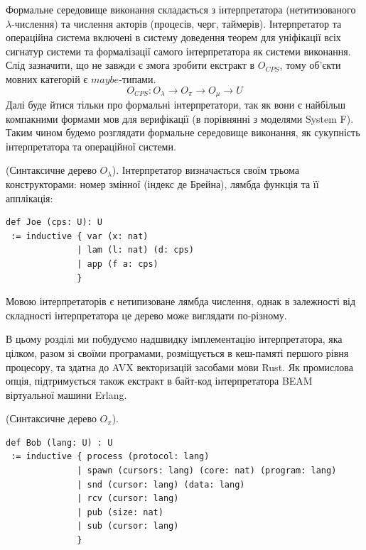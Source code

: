 Формальне середовище виконання складається з інтерпретатора
(нетитизованого $\lambda$-числення) та числення акторів (процесів, черг, таймерів).
Інтерпретатор та операційна система включені в систему доведення теорем
для уніфікації всіх сигнатур системи та формалізації самого інтерпретатора
як системи виконання. Слід зазначити, що не
завжди є змога зробити екстракт в $O_{CPS}$, тому об'єкти мовних
категорій є $maybe$-типами.
$$
O_{CPS}: O_\lambda \rightarrow O_\pi \rightarrow O_\mu \rightarrow U
$$
Далі буде йтися тільки про формальні інтерпретатори,
так як вони є найбільш компакними формами мов для
верифікації (в порівнянні з моделями System F).
Таким чином будемо розглядати формальне середовище виконання, як
сукупність інтерпретатора та операційної системи.

\begin{definition} (Синтаксичне дерево $O_\lambda$). Інтерпретатор визначається
своїм трьома конструкторами: номер змінної (індекс де Брейна),
лямбда функція та її апплікація:
\begin{lstlisting}
def Joe (cps: U): U
 := inductive { var (x: nat)
              | lam (l: nat) (d: cps)
              | app (f a: cps)
              }
\end{lstlisting}
Мовою інтерпретаторів є нетипизоване лямбда числення, однак в залежності
від складності інтерпретатора це дерево може виглядати по-різному.
\end{definition}

В цьому розділі ми побудуємо надшвидку імплементацію інтерпретатора,
яка цілком, разом зі своїми програмами, розміщується в кеш-памяті
першого рівня процесору, та здатна до AVX векторизацій засобами мови Rust.
Як промислова опція, підтримується також екстракт
в байт-код інтерпретатора BEAM віртуальної машини Erlang.

\begin{definition} (Синтаксичне дерево $O_\pi$).
\begin{lstlisting}[mathescape=true]
def Bob (lang: U) : U
 := inductive { process (protocol: lang)
              | spawn (cursors: lang) (core: nat) (program: lang)
              | snd (cursor: lang) (data: lang)
              | rcv (cursor: lang)
              | pub (size: nat)
              | sub (cursor: lang)
              }
\end{lstlisting}
\end{definition}

